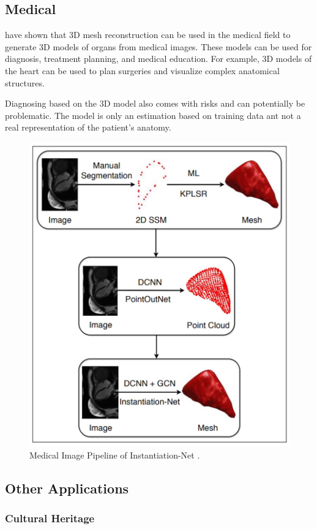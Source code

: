 \subsection{Medical}
\textcite{wang_instantiation-net_2019} have shown that 3D mesh reconstruction can be used in the medical field to generate 3D models of organs from medical images. These models can be used for diagnosis, treatment planning, and medical education. For example, 3D models of the heart can be used to plan surgeries and visualize complex anatomical structures.

Diagnosing based on the 3D model also comes with risks and can potentially be problematic. The model is only an estimation based on training data ant not a real representation of the patient's anatomy.
\begin{figure}
    \centering
    \includegraphics[width=0.7\linewidth]{images/medical.jpg}
    \caption{Medical Image Pipeline of Instantiation-Net \autocite{wang_instantiation-net_2019}.}
    \label{fig:medical}
\end{figure}

\subsection{Other Applications}

\subsubsection{Cultural Heritage}

